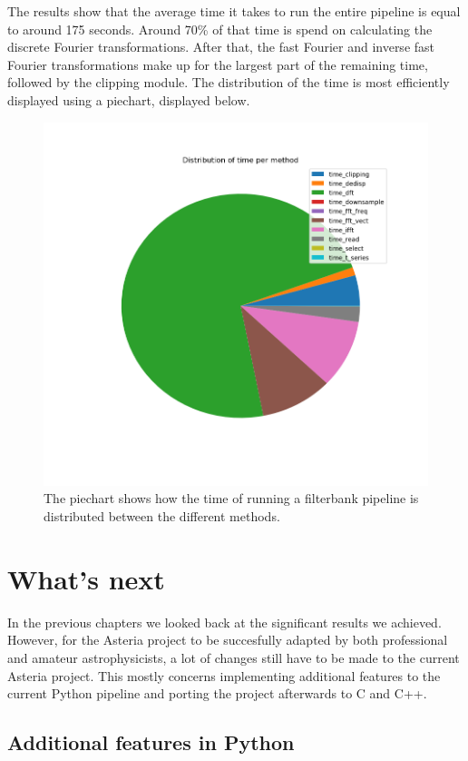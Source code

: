 \documentclass[a4paper,11pt]{report}
\begin{document}
    The results show that the average time it takes to run the entire pipeline is equal to around 175 seconds. Around 70\% of that time is spend on calculating the discrete Fourier transformations.
    After that, the fast Fourier and inverse fast Fourier transformations make up for the largest part of the remaining time, followed by the clipping module. The distribution of the time is most efficiently
    displayed using a piechart, displayed below.

    \begin{figure}[h]
        \centering
        \includegraphics[width=0.8\columnwidth]{piechart_49150}
        \caption{The piechart shows how the time of running a filterbank pipeline is distributed between the different methods. }
    \end{figure}

    \newpage

    \section{What's next}

    In the previous chapters we looked back at the significant results we achieved. However, for the Asteria project to be succesfully adapted by both professional and amateur astrophysicists, a lot of changes
    still have to be made to the current Asteria project. This mostly concerns implementing additional features to the current Python pipeline and porting the project afterwards to C and C++.

    \subsection{Additional features in Python}
\end{document}
